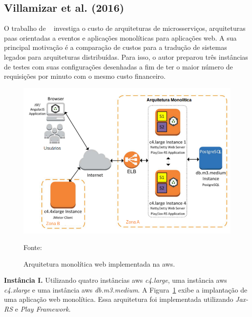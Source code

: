 \subsection{Villamizar et al. (2016)}



O trabalho de ~\cite{7515686} investiga o custo de arquiteturas de microsserviços, arquiteturas \ac{paas} orientadas a eventos e aplicações monolíticas para aplicações web.
%
A sua principal motivação é a comparação de custos para a tradução de sistemas legados para arquiteturas distribuídas.
%
Para isso, o autor preparou três instâncias de testes com suas configurações desenhadas a fim de ter o maior número de requisições por minuto com o mesmo custo financeiro.



\begin{figure}[htb!]
\caption{Arquitetura monolítica web implementada na \ac{aws}.}
\label{fig:aws_monolitico}
\includegraphics[width=\textwidth]{img/cap2/aws_monolitico.png}
\centering

Fonte:~\cite{7515686}
\end{figure}


\textbf{Instância I.} Utilizando quatro instâncias \ac{aws} \textit{c4.large}, uma instância \ac{aws} \textit{c4.xlarge} e uma instância \ac{aws} \textit{db.m3.medium}.
%
A Figura~\ref{fig:aws_monolitico} exibe a implantação de uma aplicação web monolítica.
%
Essa arquitetura foi implementada utilizando \textit{Jax-RS} e \textit{Play Framework}.




